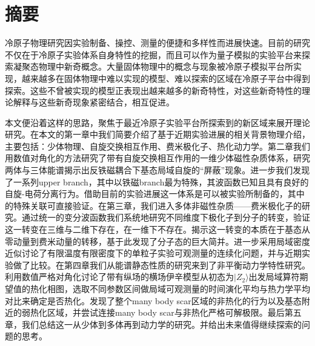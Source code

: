 \maketitle%
\MAKETITLE%
\makedeclaration%
\intobmk\chapter*{摘\quad 要}%
\setcounter{page}{1}%

冷原子物理研究因实验制备、操控、测量的便捷和多样性而进展快速。目前的研究不仅在于冷原子实验体系自身特性的挖掘，而且可以作为量子模拟的实验平台来探索凝聚态物理中新奇概念。大量固体物理中的概念与现象被冷原子模拟平台所实现，越来越多在固体物理中难以实现的模型、难以探索的区域在冷原子平台中得到探索。这些不曾被实现的模型正表现出越来越多的新奇特性，对这些新奇特性的理论解释与这些新奇现象紧密结合，相互促进。

本文便沿着这样的思路，聚焦于最近冷原子实验平台所探索到的新区域来展开理论研究。在本文的第一章中我们简要介绍了基于近期实验进展的相关背景物理介绍，主要包括：少体物理、自旋交换相互作用、费米极化子、热化动力学。第二章我们用数值对角化的方法研究了带有自旋交换相互作用的一维少体磁性杂质体系，研究两体与三体能谱揭示出反铁磁耦合下基态局域自旋的“屏蔽”现象。进一步我们发现了一系列upper branch，其中以铁磁branch最为特殊，其波函数已知且具有良好的自旋-电荷分离行为。借助目前的实验进展这一体系是可以被实验所制备的，其中的特殊关联可直接验证。在第三章，我们进入多体非磁性杂质——费米极化子的研究。通过统一的变分波函数我们系统地研究不同维度下极化子到分子的转变，验证这一转变在三维与二维下存在，在一维下不存在。揭示这一转变的本质在于基态从零动量到费米动量的转移，基于此发现了分子态的巨大简并。进一步采用局域密度近似讨论了有限温度有限密度下的单粒子实验可观测量的连续化问题，并与近期实验做了比较。在第四章我们从能谱静态性质的研究来到了非平衡动力学特性研究。利用数值严格对角化讨论了带有纵场的横场伊辛模型从初态为$|Z_2\rangle$出发局域算符期望值的热化相图，选取不同参数区间做局域可观测量的时间演化平均与热力学平均对比来确定是否热化。发现了整个many body scar区域的非热化的行为以及基态附近的弱热化区域，并尝试连接many body scar与非热化严格可解极限。最后第五章，我们总结这一从少体到多体再到动力学的研究。并给出未来值得继续探索的问题的思考。



